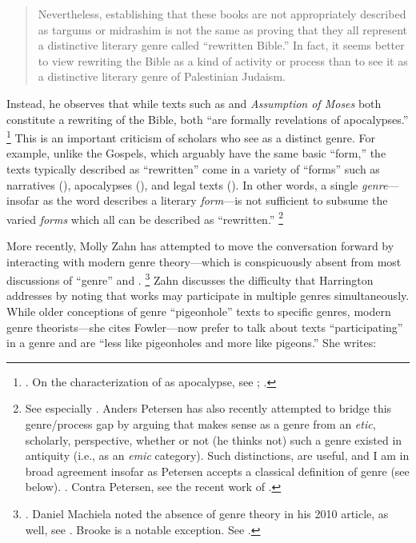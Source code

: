 \begin{quote}
    Nevertheless, establishing that these books are not appropriately described as targums or midrashim is not the same as proving that they all represent a distinctive literary genre called ``rewritten Bible.'' In fact, it seems better to view rewriting the Bible as a kind of activity or process than to see it as a distinctive literary genre of Palestinian Judaism.%
    \autocite[242--243]{harrington_kraft-nickelsburg1986}
\end{quote} 
\noindent
Instead, he observes that while texts such as \jub and \emph{Assumption of Moses} both constitute a rewriting of the Bible, both ``are formally revelations of apocalypses.''%
    \footnote{%
        \Cite[243]{harrington_kraft-nickelsburg1986}. On the characterization of \jub as apocalypse, see
        \cite{collins_mason-etal2012};
        \cite{hanneken2012}.}
This is an important criticism of scholars who see \rwb as a distinct genre. For example, unlike the Gospels, which arguably have the same basic ``form,'' the texts typically described as ``rewritten'' come in a variety of ``forms'' such as narratives (\ga), apocalypses (\jub), and legal texts (\templescroll). In other words, a single \emph{genre}---insofar as the word describes a literary \emph{form}---is not sufficient to subsume the varied \emph{forms} which all can be described as ``rewritten.''%
    \footnote{%
        See especially 
        \cite{fraade_goldstein-etal2017}. Anders Petersen has also recently attempted to bridge this genre/process gap by arguing that \rwb makes sense as a genre from an \emph{etic}, scholarly, perspective, whether or not (he thinks not) such a genre existed in antiquity (i.e., as an \emph{emic} category). Such distinctions, are useful, and I am in broad agreement insofar as Petersen accepts a classical definition of genre (see below). 
        \cite{petersen_hilhorst-puech2007}. 
        Contra Petersen, see the recent work of 
        \cite{tino_jsj2018}.}

More recently, Molly Zahn has attempted to move the conversation forward by interacting with modern genre theory---which is conspicuously absent from most discussions of ``genre'' and \rwb.%
    \footnote{%
        \Cite{zahn_jbl2012}. Daniel Machiela noted the absence of genre theory in his 2010 article, as well, see 
        \cite{machiela_jjs2010}. Brooke is a notable exception. See 
        \cite{brooke_dsd2010}.}
Zahn discusses the difficulty that Harrington addresses by noting that works may participate in multiple genres simultaneously. While older conceptions of genre ``pigeonhole'' texts to specific genres, modern genre theorists---she cites Fowler---now prefer to talk about texts ``participating'' in a genre and are ``less like pigeonholes and more like pigeons.'' She writes: 


